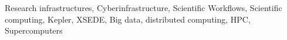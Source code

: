 Research infrastructures, Cyberinfrastructure, Scientific Workflows, Scientific computing, Kepler, XSEDE, Big data, distributed computing, HPC, Supercomputers